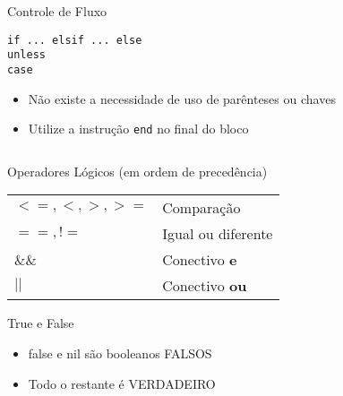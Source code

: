 \begin{frame}{Controle de Fluxo}
  \begin{center}
    \Large \verb!if ... elsif ... else! \\ \verb!unless! \\ \verb!case! 
  \end{center}   
\framebreak
  \begin{itemize}
    \item \alert{Não} existe a necessidade de uso de \alert{parênteses} ou \alert{chaves}
    \item \alert{Utilize} a instrução \verb!end! no final do bloco
  \end{itemize}   
  \begin{columns}
    \begin{column}{0.5\textwidth}
    		  
    \end{column}
    \begin{column}{0.5\textwidth}
    		  
    \end{column}
  \end{columns}
\framebreak
    		  
\framebreak
    		  
\end{frame}
\begin{frame}[fragile,t]{Operadores Lógicos (em ordem de precedência)}
	\begin{table}[tp] 	
		\setlength{\tabcolsep}{8pt}
    \setlength{\extrarowheight}{2pt}    
		\begin{tabular}{p{2.5cm}l}
    	\toprule
      $<=, <, >, >=$ &  Comparação\\
      $==, !=$ & Igual ou diferente  \\
      $\&\&$ &  Conectivo \textbf{e} \\
      $||$ & Conectivo \textbf{ou} \\
	    \bottomrule
		\end{tabular}
	\end{table}   
\end{frame}
\begin{frame}[fragile,t]{True e False}
  \begin{itemize}
    \item \alert{false} e \alert{nil} são booleanos \alert{FALSOS}
    \item Todo o restante é \alert{VERDADEIRO}
	
  \end{itemize}   
\end{frame}

